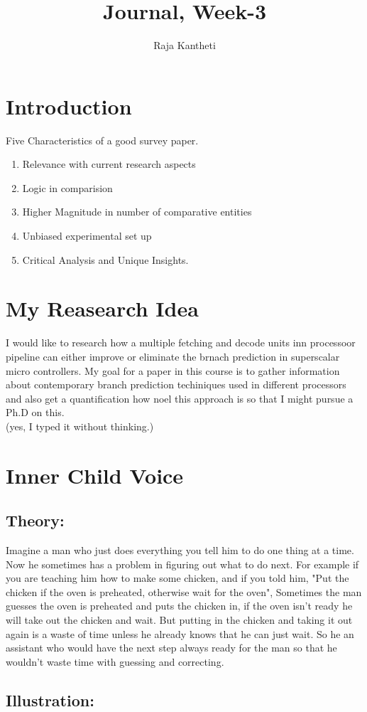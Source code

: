 \documentclass{article}
\title{Journal, Week-3}
\author{Raja Kantheti}
\begin{document}
\maketitle

\section{Introduction}
Five Characteristics of a good survey paper.
\begin{enumerate}
    \item Relevance with current research aspects
    \item Logic in comparision
    \item Higher Magnitude in number of comparative entities
    \item Unbiased experimental set up 
    \item Critical Analysis and Unique Insights. 
\end{enumerate}

\section{My Reasearch Idea}
I would like to research how a multiple fetching and decode
units inn processoor pipeline can either improve or eliminate
the brnach prediction in superscalar micro controllers. My goal for a paper
in this course is to gather information about contemporary branch prediction techiniques used in 
different processors and also get a quantification how noel this approach is so that I might pursue a Ph.D on this. 
\\
(yes, I typed it without thinking.)

\section{Inner Child Voice}
\subsection{Theory: }
Imagine a man who just does everything you tell him to do one thing at a time. Now he sometimes has a problem in figuring out what to do next.
For example if you are teaching him how to make some chicken, and if you told him, "Put the chicken if the oven is preheated, otherwise wait for the oven", Sometimes the man guesses
the oven is preheated and puts the chicken in, if the oven isn't ready he will take out the chicken and wait. But putting in the chicken and taking it out again is a waste of time unless he already knows
that he can just wait. So he an assistant who would have the next step always ready for the man so that he wouldn't waste time with guessing and correcting.
\subsection{Illustration: }




\section{}




\end{document}
